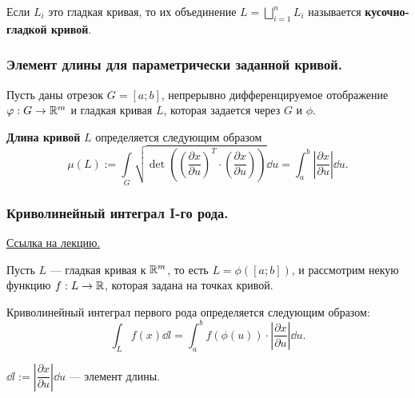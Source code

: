 \begin{definition*}
    Если $L_i$ это гладкая кривая, то их объединение $L = \bigsqcup_{i=1}^{n} L_i$ называется \textbf{кусочно-гладкой кривой}.   
\end{definition*}

\subsubsection{Элемент длины для параметрически заданной кривой.}

Пусть даны отрезок $G = [a; b]$, непрерывно дифференцируемое отображение $\varphi: G \to \mathbb{R}^m$ и гладкая кривая $L$, которая задается через $G$ и $\phi$.

\begin{definition*}
    \textbf{Длина кривой} $L$ определяется следующим образом
    \begin{equation*}
        \mu(L) := 
        \underset{G}{\int} \sqrt{\det \left( \left( \dfrac{\partial x}{\partial u} \right)^T \cdot \left( \dfrac{\partial x}{\partial u} \right) \right)} \dd u
        = \int_a^b \left| \dfrac{\partial x}{\partial u} \right| \dd u.
    \end{equation*} 
\end{definition*}

\subsubsection{Криволинейный интеграл I-го рода.}

\href{https://youtu.be/h_VmHDiSPJI?list=PLEwK9wdS5g0qV-430pfXzTawd6pI_VUgq&t=3109}{Ссылка на лекцию.}

Пусть $L$ --- гладкая кривая к $\mathbb{R}^m$, то есть $L = \phi([a; b])$, и рассмотрим некую функцию $f: L \to \mathbb{R}$, которая задана на точках кривой.

\begin{definition*}
    Криволинейный интеграл первого рода определяется следующим образом:
    \begin{equation*}
        \int_L f(x) \dd l
        = \int_a^b f(\phi(u)) \cdot \left| \dfrac{\partial x}{\partial u} \right| \dd u.
    \end{equation*}

    $\dd l := \left| \dfrac{\partial x}{\partial u} \right| \dd u$ --- элемент длины. 
\end{definition*}
